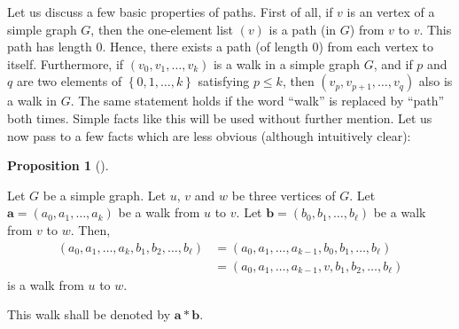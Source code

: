 \documentclass[numbers=enddot,12pt,final,onecolumn,notitlepage]{scrartcl}%
\theoremstyle{definition}
\newtheorem{prop}[theo]{Proposition}
\newenvironment{proposition}[1][]
{\begin{prop}[#1]\begin{leftbar}}
{\end{leftbar}\end{prop}}
\newcommand{\set}[1]{\left\{ #1 \right\}}
\newcommand{\tup}[1]{\left( #1 \right)}
\begin{document}
Let us discuss a few basic properties of paths. First of all, if $v$
is an vertex of a simple graph $G$, then the one-element list
$\tup{v}$ is a path (in $G$) from $v$ to $v$. This path has length
$0$. Hence, there exists a path (of length $0$) from each vertex to
itself. Furthermore, if $\tup{v_0, v_1, \ldots, v_k}$ is a walk in a
simple graph $G$, and if $p$ and $q$ are two elements of
$\set{0, 1, \ldots, k}$ satisfying $p \leq k$, then
$\tup{v_p, v_{p+1}, \ldots, v_q}$ also is a walk in $G$. The same
statement holds if the word ``walk'' is replaced by ``path'' both
times. Simple facts like this will be used without further mention.
Let us now pass to a few facts which are less obvious (although
intuitively clear):

\begin{proposition} \label{prop.walks.concat}
Let $G$ be a simple graph. Let $u$, $v$ and $w$ be three vertices of
$G$.
Let $\mathbf{a} = \tup{a_0, a_1, \ldots, a_k}$ be a walk from $u$ to
$v$. 
Let $\mathbf{b} = \tup{b_0, b_1, \ldots, b_\ell}$ be a walk from $v$
to $w$.
Then,
\begin{align*}
\tup{a_0, a_1, \ldots, a_k, b_1, b_2, \ldots, b_\ell}
&= \tup{a_0, a_1, \ldots, a_{k-1}, b_0, b_1, \ldots, b_\ell} \\
&= \tup{a_0, a_1, \ldots, a_{k-1}, v, b_1, b_2, \ldots, b_\ell}
\end{align*}
is a walk from $u$ to $w$.

This walk shall be denoted by $\mathbf{a} * \mathbf{b}$.
\end{proposition}
\end{document}
